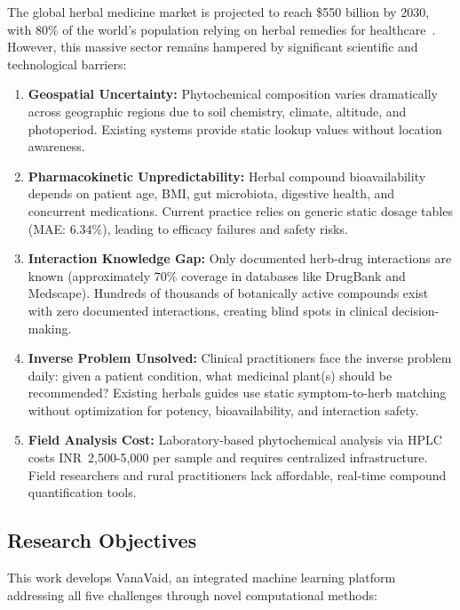 \documentclass[11pt,a4paper]{article}
\begin{document}
The global herbal medicine market is projected to reach \$550 billion by 2030, with 80\% of the world's population relying on herbal remedies for healthcare~\cite{napralert2016}. However, this massive sector remains hampered by significant scientific and technological barriers:

\begin{enumerate}
    \item \textbf{Geospatial Uncertainty:} Phytochemical composition varies dramatically across geographic regions due to soil chemistry, climate, altitude, and photoperiod. Existing systems provide static lookup values without location awareness.
    
    \item \textbf{Pharmacokinetic Unpredictability:} Herbal compound bioavailability depends on patient age, BMI, gut microbiota, digestive health, and concurrent medications. Current practice relies on generic static dosage tables (MAE: 6.34\%), leading to efficacy failures and safety risks.
    
    \item \textbf{Interaction Knowledge Gap:} Only documented herb-drug interactions are known (approximately 70\% coverage in databases like DrugBank and Medscape). Hundreds of thousands of botanically active compounds exist with zero documented interactions, creating blind spots in clinical decision-making.
    
    \item \textbf{Inverse Problem Unsolved:} Clinical practitioners face the inverse problem daily: given a patient condition, what medicinal plant(s) should be recommended? Existing herbals guides use static symptom-to-herb matching without optimization for potency, bioavailability, and interaction safety.
    
    \item \textbf{Field Analysis Cost:} Laboratory-based phytochemical analysis via HPLC costs INR~2,500-5,000 per sample and requires centralized infrastructure. Field researchers and rural practitioners lack affordable, real-time compound quantification tools.
\end{enumerate}

\subsection{Research Objectives}

This work develops VanaVaid, an integrated machine learning platform addressing all five challenges through novel computational methods:
\end{document}
